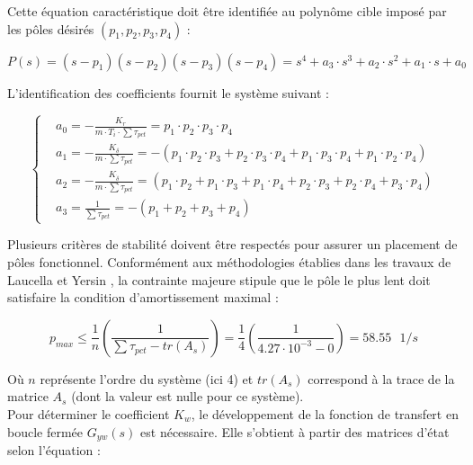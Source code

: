 Cette équation caractéristique doit être identifiée au polynôme cible imposé par les pôles désirés $(p_1, p_2, p_3, p_4)$ :

\begin{equation}
    P(s) = (s - p_1)(s - p_2)(s - p_3)(s - p_4) = s^4 + a_3 \cdot s^3 + a_2 \cdot s^2 + a_1 \cdot s + a_0
\end{equation}

L'identification des coefficients fournit le système suivant :

\begin{equation}
    \left\{
    \begin{aligned}
         & a_0 = -\displaystyle\frac{K_r}{m \cdot T_i \cdot \sum\tau_{pct}} = p_1 \cdot p_2 \cdot p_3 \cdot p_4
        \\
         & a_1 = -\displaystyle\frac{K_\delta}{m \cdot \sum\tau_{pct}} = -(p_1 \cdot p_2 \cdot p_3 + p_2 \cdot p_3 \cdot p_4 + p_1 \cdot p_3 \cdot p_4 + p_1 \cdot p_2 \cdot p_4)
        \\
         & a_2 = -\displaystyle\frac{K_{\dot{\delta}}}{m \cdot \sum\tau_{pct}} = (p_1 \cdot p_2 + p_1 \cdot p_3 + p_1 \cdot p_4 + p_2 \cdot p_3 + p_2 \cdot p_4 + p_3 \cdot p_4)
        \\
         & a_3 = \displaystyle\frac{1}{\sum\tau_{pct}} = -(p_1 + p_2 + p_3 + p_4)
    \end{aligned}
    \right.
\end{equation}

Plusieurs critères de stabilité doivent être respectés pour assurer un placement de pôles fonctionnel. Conformément aux méthodologies établies dans les travaux de Laucella \cite{Laucella} et Yersin \cite{Yersin}, la contrainte majeure stipule que le pôle le plus lent doit satisfaire la condition d'amortissement maximal :

\begin{equation}
    p_{max} \leq \frac{1}{n}\left( \frac{1}{\sum\tau_{pct} - tr\left(A_s\right)} \right) = \frac{1}{4}\left( \frac{1}{4.27\cdot 10^{-3} - 0} \right) = 58.55\text{ $1/s$}
\end{equation}

Où $n$ représente l'ordre du système (ici 4) et $tr\left(A_s\right)$ correspond à la trace de la matrice $A_s$ (dont la valeur est nulle pour ce système).\\

Pour déterminer le coefficient $K_w$, le développement de la fonction de transfert en boucle fermée $G_{yw}(s)$ est nécessaire. Elle s'obtient à partir des matrices d'état selon l'équation :

